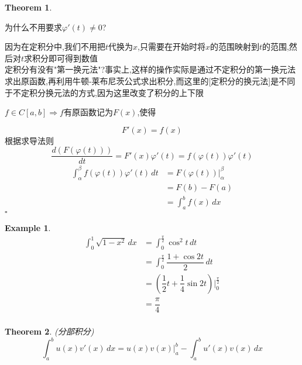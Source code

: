 \documentclass[11pt,hyperref,a4paper,UTF8]{ctexart}
\newtheorem{theorem}{Theorem}[subsection]
\newtheorem{lemma}{Lemma}[subsection]
\newtheorem{example}{Example}[subsection]
\newenvironment{cproof}{%
\heiti{证明}\kaishu
}{%
  \hfill $\square$
  \par\bigskip
}
\begin{document}
\begin{CJK}{UTF8}{gkai}
\begin{theorem}
\end{theorem}
为什么不用要求$\varphi'(t) \neq 0$?

因为在定积分中,我们不用把$t$代换为$x$,只需要在开始时将$x$的范围映射到$t$的范围,然后对$t$求积分即可得到数值\\

定积分有没有"第一换元法"?事实上,这样的操作实际是通过不定积分的第一换元法求出原函数,再利用牛顿-莱布尼茨公式求出积分,而这里的[定积分的换元法]是不同于不定积分换元法的方式,因为这里改变了积分的上下限\\
\begin{cproof}
$f\in C[a,b] \Rightarrow f$有原函数记为$F(x)$,使得

\[F'(x) = f(x)\]
根据求导法则
\[\dfrac{d(F(\varphi(t)))}{dt} = F'(x)\varphi'(t) = f(\varphi(t))\varphi'(t)\]
\[
\begin{aligned}
\int_{\alpha}^{\beta}f(\varphi(t))\varphi'(t)\,dt &= F(\varphi(t))|_{\alpha}^{\beta}\\
&=F(b) - F(a)\\
&=\int_{a}^{b}f(x)\,dx 
\end{aligned}
\]
\end{cproof}

\begin{example}
  \[
  \begin{aligned}
  \int_{0}^{1}\sqrt{1 - x^2}\, dx &= \int_{0}^{\frac{\pi}{2}} \cos^2 t \, dt\\
  &=\int_{0}^{\frac{\pi}{2}} \dfrac{1 + \cos 2t}{2} \, dt\\
  &=\left(\dfrac{1}{2}t + \dfrac{1}{4}\sin 2t\right)\Big\vert_0^{\frac{\pi}{2}}\\
  &=\dfrac{\pi}{4}\\
  \end{aligned}
  \]
\end{example}
\begin{theorem}
  (分部积分)
  \[\int_{a}^{b}u(x)v'(x)\,dx = u(x)v(x)|_a ^b-\int_{a}^{b}u'(x)v(x)\,dx \]
\end{theorem}




\end{CJK}
\end{document}
